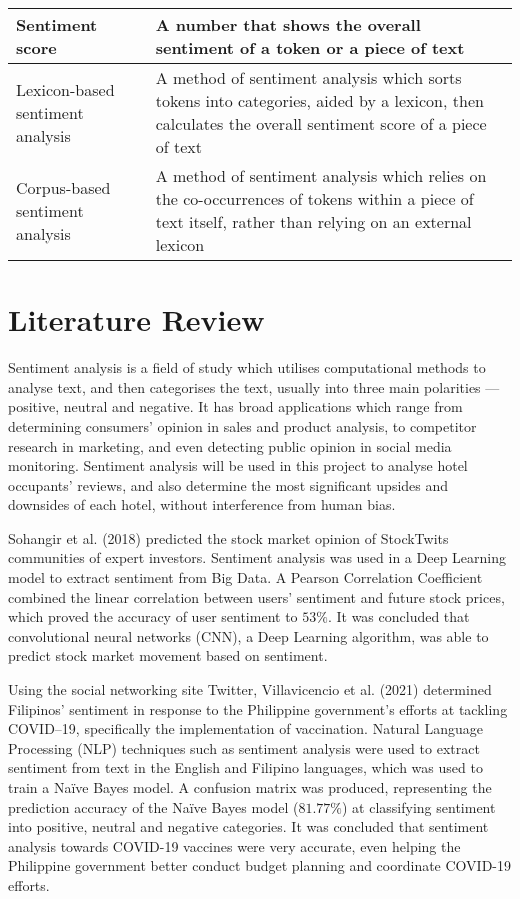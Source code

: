 \documentclass[12pt,bibliography=totocnumbered]{scrartcl}
\begin{document}
\begin{table}[htpb]
\begin{center}
\begin{tabular}[]{|p{}|p{}|}
			\hline
			Sentiment score                  & A number that shows the overall sentiment of a token or a piece of text                                                                                      \\
			\hline
			Lexicon-based sentiment analysis & A method of sentiment analysis which sorts tokens into categories, aided by a lexicon, then calculates the overall sentiment score of a piece of text        \\
			\hline
			Corpus-based sentiment analysis  & A method of sentiment analysis which relies on the co-occurrences of tokens within a piece of text itself, rather than relying on an external lexicon        \\
			\hline
		\end{tabular}
	\end{center}
\end{table}

\pagebreak

\section{Literature Review}
Sentiment analysis is a field of study which utilises computational methods to analyse text,
and then categorises the text, usually into three main polarities ---  positive, neutral
and negative. It has broad applications which range from determining consumers' opinion in
sales and product analysis, to competitor research in marketing, and even detecting public
opinion in social media monitoring. Sentiment analysis will be used in this project to
analyse hotel occupants' reviews, and also determine the most significant upsides
and downsides of each hotel, without interference from human bias.

Sohangir et al. (2018) predicted the stock market opinion of StockTwits communities
of expert investors. Sentiment analysis was used in a Deep Learning model to extract
sentiment from Big Data. A Pearson Correlation Coefficient combined the linear correlation
between users' sentiment and future stock prices, which
proved the accuracy of user sentiment to $53\%$.
It was concluded that convolutional neural networks (CNN), a Deep Learning algorithm,
was able to predict stock market movement based on sentiment.

Using the social networking site Twitter, Villavicencio et al. (2021)
determined Filipinos' sentiment in response to the Philippine government's efforts
at tackling COVID--19, specifically the implementation of vaccination. Natural
Language Processing (NLP) techniques such as sentiment analysis were used to
extract sentiment from text in the English and Filipino languages, which was used to
train a Naïve Bayes model. A confusion matrix was produced, representing the
prediction accuracy of the Naïve Bayes model ($81.77\%$) at classifying
sentiment into positive, neutral and negative categories. It was concluded that
sentiment analysis towards COVID-19 vaccines were very accurate, even helping the
Philippine government better conduct budget planning and coordinate COVID-19 efforts.
\end{document}
